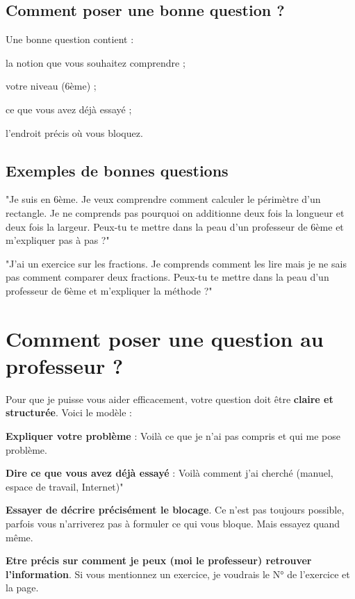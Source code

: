 \documentclass[answers]{exam}
\begin{document}
\subsection*{Comment poser une bonne question ?}

Une bonne question contient :
\begin{compactitem}
  \item la notion que vous souhaitez comprendre ;
  \item votre niveau (6ème) ;
  \item ce que vous avez déjà essayé ;
  \item l’endroit précis où vous bloquez.
\end{compactitem}

\subsection*{Exemples de bonnes questions}

\begin{compactitem}
  \item "Je suis en 6ème. Je veux comprendre comment calculer le périmètre d’un rectangle. Je ne comprends pas pourquoi on additionne deux fois la longueur et deux fois la largeur. Peux-tu te mettre dans la peau d'un professeur de 6ème et m'expliquer pas à pas ?"
  \item "J'ai un exercice sur les fractions. Je comprends comment les lire mais je ne sais pas comment comparer deux fractions. Peux-tu te mettre dans la peau d'un professeur de 6ème et m'expliquer la méthode ?"
\end{compactitem}

\section{Comment poser une question au professeur ?}

Pour que je puisse vous aider efficacement, votre question doit être \textbf{claire et structurée}. Voici le modèle :

\begin{compactitem}
  \item \textbf{Expliquer votre problème} : Voilà ce que je n'ai pas compris et qui me pose problème.
  \item \textbf{Dire ce que vous avez déjà essayé} : Voilà comment j'ai cherché (manuel, espace de travail, Internet)"
  \item \textbf{Essayer de décrire précisément le blocage}. Ce n'est pas toujours possible, parfois vous n'arriverez pas à formuler ce qui vous bloque. Mais essayez quand même.
  \item \textbf{Etre précis sur comment je peux (moi le professeur) retrouver l'information}. Si vous mentionnez un exercice, je voudrais le N° de l'exercice et la page. 
\end{compactitem}
\end{document}
